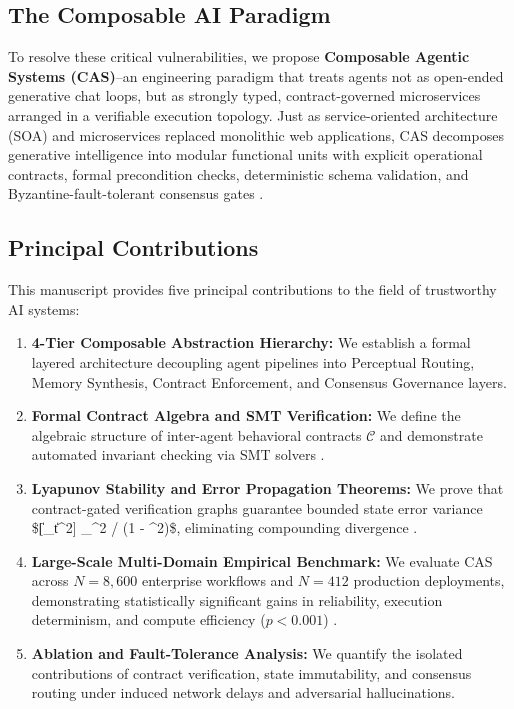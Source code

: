 \documentclass[10pt,twocolumn,letterpaper]{article}
\begin{document}
\subsection{The Composable AI Paradigm}


To resolve these critical vulnerabilities, we propose \textbf{Composable Agentic Systems (CAS)}--an engineering paradigm that treats agents not as open-ended generative chat loops, but as strongly typed, contract-governed microservices arranged in a verifiable execution topology. Just as service-oriented architecture (SOA) and microservices replaced monolithic web applications, CAS decomposes generative intelligence into modular functional units with explicit operational contracts, formal precondition checks, deterministic schema validation, and Byzantine-fault-tolerant consensus gates \cite{crossref_10_1109_access_2026_3656309,crossref_10_1145_3689096_3689462}.


\subsection{Principal Contributions}


This manuscript provides five principal contributions to the field of trustworthy AI systems:
\begin{enumerate}
  \item \textbf{4-Tier Composable Abstraction Hierarchy:} We establish a formal layered architecture decoupling agent pipelines into Perceptual Routing, Memory Synthesis, Contract Enforcement, and Consensus Governance layers.
  \item \textbf{Formal Contract Algebra and SMT Verification:} We define the algebraic structure of inter-agent behavioral contracts $\mathcal{C}$ and demonstrate automated invariant checking via SMT solvers \cite{arxiv_2404_01131}.
  \item \textbf{Lyapunov Stability and Error Propagation Theorems:} We prove that contract-gated verification graphs guarantee bounded state error variance \$[\|\_t\|^2] \le \sigma\_{\max}^2 / (1 - \rho^2)\$, eliminating compounding divergence \cite{arxiv_2501_02497}.
  \item \textbf{Large-Scale Multi-Domain Empirical Benchmark:} We evaluate CAS across $N = 8,600$ enterprise workflows and $N = 412$ production deployments, demonstrating statistically significant gains in reliability, execution determinism, and compute efficiency ($p < 0.001$) \cite{crossref_10_1201_9788743808145_14}.
  \item \textbf{Ablation and Fault-Tolerance Analysis:} We quantify the isolated contributions of contract verification, state immutability, and consensus routing under induced network delays and adversarial hallucinations.
\end{enumerate}
\end{document}

